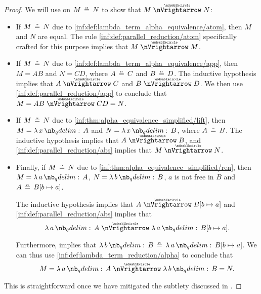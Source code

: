 \begin{proof}
   We will use  on \( M \aequiv N \) to show that \( M \ppred N \):
  \begin{itemize}
    \item If \( M \aequiv N \) due to \ref{inf:def:lambda_term_alpha_equivalence/atom}, then \( M \) and \( N \) are equal. The rule \ref{inf:def:parallel_reduction/atom} specifically crafted for this purpose implies that \( M \ppred M \).

    \item If \( M \aequiv N \) due to \ref{inf:def:lambda_term_alpha_equivalence/app}, then \( M = AB \) and \( N = CD \), where \( A \aequiv C \) and \( B \aequiv D \). The inductive hypothesis implies that \( A \ppred C \) and \( B \ppred D \). We then use \ref{inf:def:parallel_reduction/app} to conclude that \( M = AB \ppred CD = N \).

    \item If \( M \aequiv N \) due to \ref{inf:thm:alpha_equivalence_simplified/lift}, then \( M = \qabs x A \) and \( N = \qabs x B \), where \( A \aequiv B \). The inductive hypothesis implies that \( A \ppred B \), and \ref{inf:def:parallel_reduction/abs} implies that \( M \ppred N \).

    \item Finally, if \( M \aequiv N \) due to \ref{inf:thm:alpha_equivalence_simplified/ren}, then \( M = \qabs a A \), \( N = \qabs b B \), \( a \) is not free in \( B \) and \( A \aequiv B[b \mapsto a] \).

    The inductive hypothesis implies that \( A \ppred B[b \mapsto a] \) and \ref{inf:def:parallel_reduction/abs} implies that
    \begin{equation*}
      \qabs a A \ppred \qabs a B[b \mapsto a].
    \end{equation*}

    Furthermore,  implies that \( \qabs b B \aequiv \qabs a B[b \mapsto a] \). We can thus use \ref{inf:def:lambda_term_reduction/alpha} to conclude that
    \begin{equation*}
      M = \qabs a A \ppred \qabs b B = N.
    \end{equation*}
  \end{itemize}

   This is straightforward once we have mitigated the subtlety discussed in .


\end{proof}
